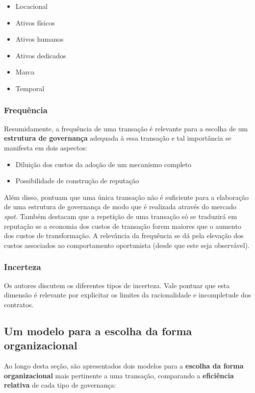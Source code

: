 \begin{itemize}
	\item Locacional
	\item Ativos físicos
	\item Ativos humanos
	\item Ativos dedicados
	\item Marca
	\item Temporal
\end{itemize}

\subsubsection*{Frequência}

Resumidamente, a frequência de uma transação é relevante para a escolha de um \textbf{estrutura de governança} adequada à essa transação e tal importância se manifesta em dois aspectos:

\begin{itemize}
	\item Diluição dos custos da adoção de um mecanismo completo
	\item Possibilidade de construção de reputação
\end{itemize}

Além disso, pontuam que uma única transação não é suficiente para a elaboração de uma estrutura de governança de modo que é realizada através do mercado \textit{spot}. Também destacam que a repetição de uma transação só se traduzirá em reputação se a economia  dos custos de transação forem maiores que o aumento dos custos de transformação. A relevância da frequência se dá pela elevação dos custos associados ao comportamento oportunista (desde que este seja observável).

\subsubsection*{Incerteza}

Os autores discutem os diferentes tipos de incerteza. Vale pontuar que esta dimensão é relevante por explicitar os limites da racionalidade e incompletude dos contratos.

\subsection*{Um modelo para a escolha da forma organizacional}

Ao longo desta seção, são apresentados dois modelos para a \textbf{escolha da forma organizacional} mais pertinente a uma transação, comparando a \textbf{eficiência relativa} de cada tipo de governança:


